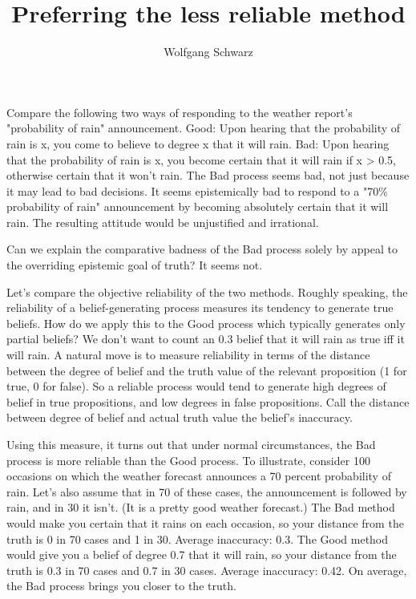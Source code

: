 \documentclass{article}
\begin{document}
\title{Preferring the less reliable method}
\author{Wolfgang Schwarz}

\maketitle

Compare the following two ways of responding to the weather report's "probability of rain" announcement. Good: Upon hearing that the probability of rain is x, you come to believe to degree x that it will rain.  Bad: Upon hearing that the probability of rain is x, you become certain that it will rain if x > 0.5, otherwise certain that it won't rain. The Bad process seems bad, not just because it may lead to bad decisions. It seems epistemically bad to respond to a "70\% probability of rain" announcement by becoming absolutely certain that it will rain. The resulting attitude would be unjustified and irrational.

Can we explain the comparative badness of the Bad process solely by appeal to the overriding epistemic goal of truth? It seems not.

Let's compare the objective reliability of the two methods. Roughly speaking, the reliability of a belief-generating process measures its tendency to generate true beliefs. How do we apply this to the Good process which typically generates only partial beliefs? We don't want to count an 0.3 belief that it will rain as true iff it will rain. A natural move is to measure reliability in terms of the distance between the degree of belief and the truth value of the relevant proposition (1 for true, 0 for false). So a reliable process would tend to generate high degrees of belief in true propositions, and low degrees in false propositions. Call the distance between degree of belief and actual truth value the belief's inaccuracy.

Using this measure, it turns out that under normal circumstances, the Bad process is more reliable than the Good process. To illustrate, consider 100 occasions on which the weather forecast announces a 70 percent probability of rain. Let's also assume that in 70 of these cases, the announcement is followed by rain, and in 30 it isn't. (It is a pretty good weather forecast.) The Bad method would make you certain that it rains on each occasion, so your distance from the truth is 0 in 70 cases and 1 in 30. Average inaccuracy: 0.3. The Good method would give you a belief of degree 0.7 that it will rain, so your distance from the truth is 0.3 in 70 cases and 0.7 in 30 cases. Average inaccuracy: 0.42. On average, the Bad process brings you closer to the truth.
\end{document}
